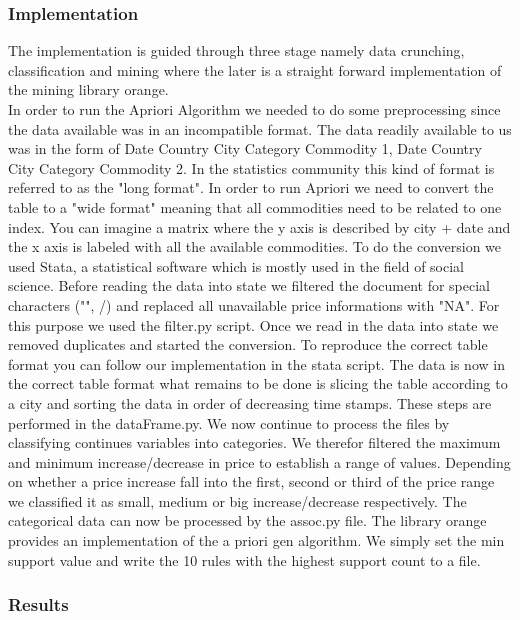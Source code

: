 \subsubsection{Implementation}

The implementation is guided through three stage namely data crunching, classification and  mining where the later is a straight forward implementation of the mining library orange. \\



In order to run the Apriori Algorithm we needed to do some preprocessing since the data available was in an incompatible format. The data readily available to us was in the form
of Date Country City Category Commodity 1, Date Country City Category Commodity 2. In the statistics community this kind of format is referred to as the "long format". In order to run Apriori we need to convert the table to a "wide format" meaning that all commodities need to be related to one index. You can imagine a matrix where the y axis is described by city + date and the x axis is labeled with all the available commodities. To do the conversion we used Stata, a statistical software which is mostly used in the field of social science. Before reading the data into state we filtered the document for special characters ("", /) and replaced all unavailable price informations with "NA". For this purpose we used the filter.py script. Once we read in the data into state we removed duplicates and started the conversion. To reproduce the correct table format you can follow our implementation in the stata script.  The data is now in the correct table format what remains to be done is slicing the table according to a city and sorting the data in order of decreasing time stamps. These steps are performed in the dataFrame.py. We now continue to process the files by classifying continues variables into categories. We therefor filtered the maximum and minimum increase/decrease in price to establish a range of values. Depending on whether a price increase fall into the first, second or third of the price range we classified it as small, medium or big increase/decrease respectively. The categorical data can now be processed by the assoc.py file. The library orange provides an implementation of the a priori gen algorithm. We simply set the min support value and write the 10 rules with the highest support count to a file.

\subsubsection{Results}

